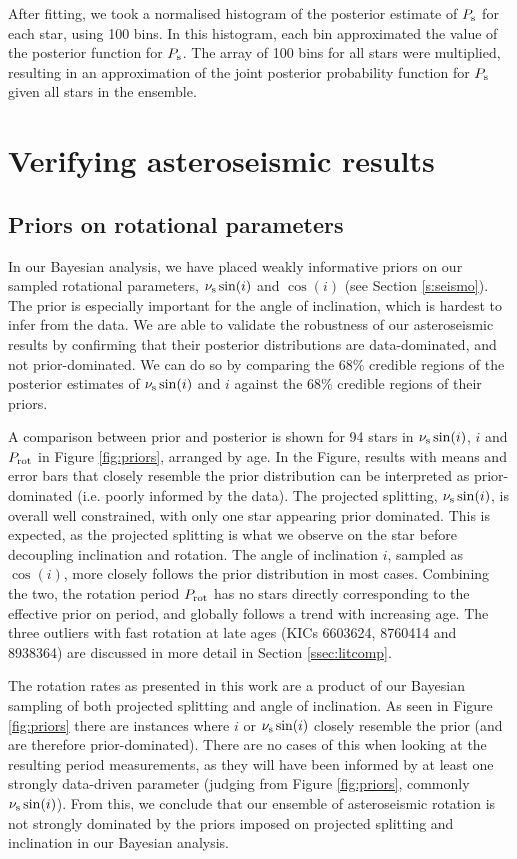 \documentclass[12pt]{article}
\begin{document}
After fitting, we took a normalised histogram of the posterior estimate of $P_{\rm s}$ for each star, using 100 bins. In this histogram, each bin approximated the value of the posterior function for $P_{\rm s}$. The array of 100 bins for all stars were multiplied, resulting in an approximation of the joint posterior probability function for $P_{\rm s}$ given all stars in the ensemble.


\section{Verifying asteroseismic results}
\subsection{Priors on rotational parameters}
In our Bayesian analysis, we have placed weakly informative priors on our sampled rotational parameters, $\nu_{\rm s}\sin(i)$ and $\cos(i)$ (see Section \ref{s:seismo}). The prior is especially important for the angle of inclination, which is hardest to infer from the data. We are able to validate the robustness of our asteroseismic results by confirming that their posterior distributions are data-dominated, and not prior-dominated. We can do so by comparing the $68\%$ credible regions of the posterior estimates of $\nu_{\rm s}\sin(i)$ and $i$ against the $68\%$ credible regions of their priors.

A comparison between prior and posterior is shown for 94 stars in $\nu_{\rm s}\sin(i)$, $i$ and $P_{\rm rot}$ in Figure \ref{fig:priors}, arranged by age. In the Figure, results with means and error bars that closely resemble the prior distribution can be interpreted as prior-dominated (i.e. poorly informed by the data). The projected splitting, $\nu_{\rm s}\sin(i)$, is overall well constrained, with only one star appearing prior dominated. This is expected, as the projected splitting is what we observe on the star before decoupling inclination and rotation. The angle of inclination $i$, sampled as $\cos(i)$, more closely follows the prior distribution in most cases. Combining the two, the rotation period $P_{\rm rot}$ has no stars directly corresponding to the effective prior on period, and globally follows a trend with increasing age. The three outliers with fast rotation at late ages (KICs 6603624, 8760414 and 8938364) are discussed in more detail in Section \ref{ssec:litcomp}.

The rotation rates as presented in this work are a product of our Bayesian sampling of both projected splitting and angle of inclination. As seen in Figure \ref{fig:priors} there are instances where $i$ or $\nu_{\rm s}\sin(i)$ closely resemble the prior (and are therefore prior-dominated). There are no cases of this when looking at the resulting period measurements, as they will have been informed by at least one strongly data-driven parameter (judging from Figure \ref{fig:priors}, commonly $\nu_{\rm s}\sin(i)$). From this, we conclude that our ensemble of asteroseismic rotation is not strongly dominated by the priors imposed on projected splitting and inclination in our Bayesian analysis.
\end{document}
